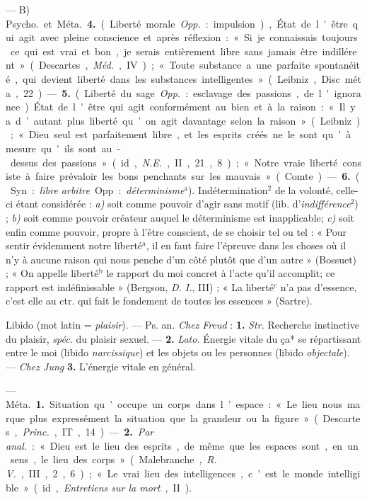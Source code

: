 \begin{itemize}[leftmargin=1cm, label=, itemsep=1pt]
— B) \si{Psycho.} et \si{Méta.} {\bf 4.} (Liberté morale. {\it Opp.} :
impulsion), État de l'être qui agit avec pleine conscience et après
réflexion : « Si je connaissais toujours ce qui est vrai et bon,... je serais
entièrement libre sans jamais être indillérent » (Descartes, {\it Méd.},
IV) ; « Toute substance a une parfaite spontanéité, qui devient liberté dans
les substances intelligentes » (Leibniz, Disc. méta., 22). —
{\bf 5.} (Liberté du sage. {\it Opp.} : esclavage des passions, de
l'ignorance). État de l'être qui agit conformément au bien et à la raison :
« Il y a d’autant plus liberté qu’on agit davantage selon la
raison » (Leibniz) ; « Dieu seul est parfaitement libre, et les esprits créés
ne le sont qu’à mesure qu'ils sont au-dessus des passions » (id., {\it N.E.},
II, 21, 8) ; « Notre vraie liberté consiste à faire prévaloir les bons
penchants sur les mauvais » (Comte). — {\bf 6.} (Syn. : {\it libre arbitre}.
Opp. : {\it déterminisme}$^\text{a}$). Indétermination$^2$ de la volonté,
celle-ci étant considérée : {\it a)} soit comme pouvoir d’agir sans motif
(lib. d’{\it indifférence}$^2$) ; {\it b)} soit comme pouvoir créateur auquel
le déterminisme est inapplicable; {\it c)} soit enfin comme pouvoir, propre à
l'être conscient, de se choisir tel ou tel : « Pour sentir évidemment notre
liberté$^\text{a}$, il en faut faire l'épreuve dans les choses où il n’y à
aucune raison qui nous penche d’un côté plutôt que d’un autre » (Bossuet) ;
« On appelle liberté$^\text{b}$ le rapport du moi concret à l'acte qu'il
accomplit; ce rapport est indéfinissable » (Bergson, {\it D. I.}, III) ; « La
liberté$^\text{c}$ n’a pas d'essence, c’est elle au ctr. qui fait le
fondement de toutes les essences » (Sartre).

Libido (mot latin = {\it plaisir}). — Ps. an. {\it Chez Freud} : {\bf 1.}
{\it Str.} Recherche instinctive du plaisir, {\it spéc.} du plaisir sexuel. —
{\bf 2.} {\it Lato.} Énergie vitale du ça* se répartissant entre le moi
(libido {\it narcissique}) et les objets ou les personnes (libido
{\it objectale}). — {\it Chez Jung} {\bf 3.} L'énergie vitale en général.

 — \si{Méta.} {\bf 1.} Situation qu’occupe un corps dans l’espace :
« Le lieu nous marque plus expressément la situation que la grandeur ou la
figure » (Descartes, {\it Princ.}, IT, 14). — {\bf 2.} {\it Par anal.} :
« Dieu est le lieu des esprits, de même que les espaces sont, en un sens, le
lieu des corps » (Malebranche, {\it R. V.}, III, 2, 6) ; « Le vrai lieu des
intelligences, c’est le monde intelligible » (id., {\it Entretiens sur la
mort}, II).


\end{itemize}
